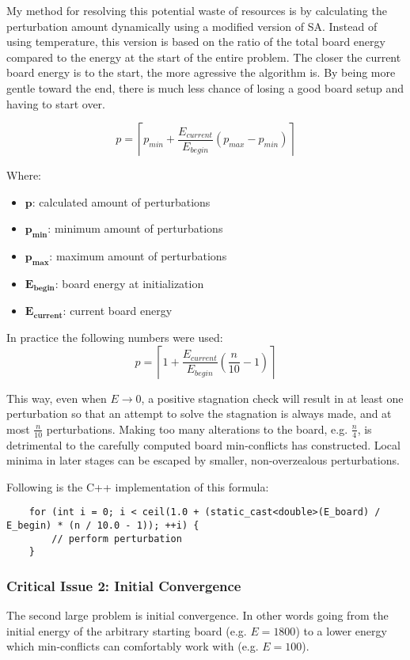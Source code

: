 \documentclass{article}
\begin{document}
My method for resolving this potential waste of resources is by calculating the perturbation amount dynamically using a modified version of SA.
Instead of using temperature, this version is based on the ratio of the total board energy compared to the energy at the start of the entire problem.
The closer the current board energy is to the start, the more agressive the algorithm is. By being more gentle toward the end,
there is much less chance of losing a good board setup and having to start over.

\[
    p = \left\lceil p_{min}+\frac{E_{current}}{E_{begin}} \left(p_{max} - p_{min}\right)\right\rceil
\]

Where:

\begin{itemize}
    \item $\mathbf{p}$: calculated amount of perturbations
    \item $\mathbf{p_{min}}$: minimum amount of perturbations
    \item $\mathbf{p_{max}}$: maximum amount of perturbations
    \item $\mathbf{E_{begin}}$: board energy at initialization
    \item $\mathbf{E_{current}}$: current board energy
\end{itemize}

In practice the following numbers were used:
\[
    p = \left\lceil 1+\frac{E_{current}}{E_{begin}} \left(\frac{n}{10} - 1\right)\right\rceil
\]

This way, even when $E\to0$, a positive stagnation check will result in at least one perturbation so that an attempt to solve the stagnation is always made,
and at most $\frac{n}{10}$ perturbations.
Making too many alterations to the board, e.g. $\frac{n}{4}$, is detrimental to the carefully computed board min-conflicts has constructed.
Local minima in later stages can be escaped by smaller, non-overzealous perturbations.

Following is the C++ implementation of this formula:

\begin{lstlisting}
    for (int i = 0; i < ceil(1.0 + (static_cast<double>(E_board) / E_begin) * (n / 10.0 - 1)); ++i) {
        // perform perturbation
    }
\end{lstlisting}

\subsubsection{Critical Issue 2: Initial Convergence}
The second large problem is initial convergence. In other words going from the initial energy of the arbitrary starting board (e.g. $E=1800$)
to a lower energy which min-conflicts can comfortably work with (e.g. $E=100$).
\end{document}
